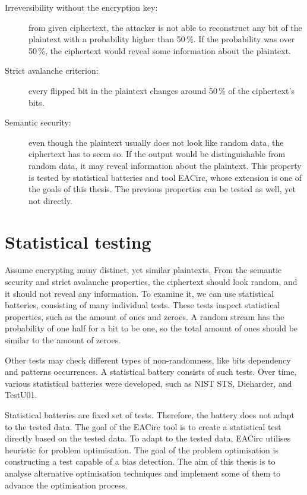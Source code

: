 \documentclass[
    digital,    %
    oneside,    %
    color,
    11pt,
    nocover,
    notable,
    nolof,
    nolot,
]{fithesis3}
\begin{document}
\begin{description}
    \item[Irreversibility without the encryption key:] from given ciphertext, the attacker is not able to reconstruct any bit of the plaintext with a probability higher than 50\,\%. If the probability was over 50\,\%, the ciphertext would reveal some information about the plaintext. %

    \item[Strict avalanche criterion:] every flipped bit in the plaintext changes around 50\,\% of the ciphertext's bits.

    \item[Semantic security:] even though the plaintext usually does not look like random data, the ciphertext has to seem so. If the output would be distinguishable from random data, it may reveal information about the plaintext. This property is tested by statistical batteries and tool EACirc, whose extension is one of the goals of this thesis. The previous properties can be tested as well, yet not directly.
\end{description}


\section{Statistical testing}
\label{sec:stat-testing}

Assume encrypting many distinct, yet similar plaintexts. From the semantic security and strict avalanche properties, the ciphertext should look random, and it should not reveal any information. To examine it, we can use statistical batteries, consisting of many individual tests. These tests inspect statistical properties, such as the amount of ones and zeroes. A random stream has the probability of one half for a bit to be one, so the total amount of ones should be similar to the amount of zeroes.

Other tests may check different types of non-randomness, like bits dependency and patterns occurrences. A statistical battery consists of such tests. Over time, various statistical batteries were developed, such as NIST STS, Dieharder, and TestU01.

Statistical batteries are fixed set of tests. Therefore, the battery does not adapt to the tested data. The goal of the EACirc tool is to create a statistical test directly based on the tested data. To adapt to the tested data, EACirc utilises heuristic for problem optimisation. The goal of the problem optimisation is constructing a test capable of a bias detection. The aim of this thesis is to analyse alternative optimisation techniques and implement some of them to advance the optimisation process.
\end{document}
